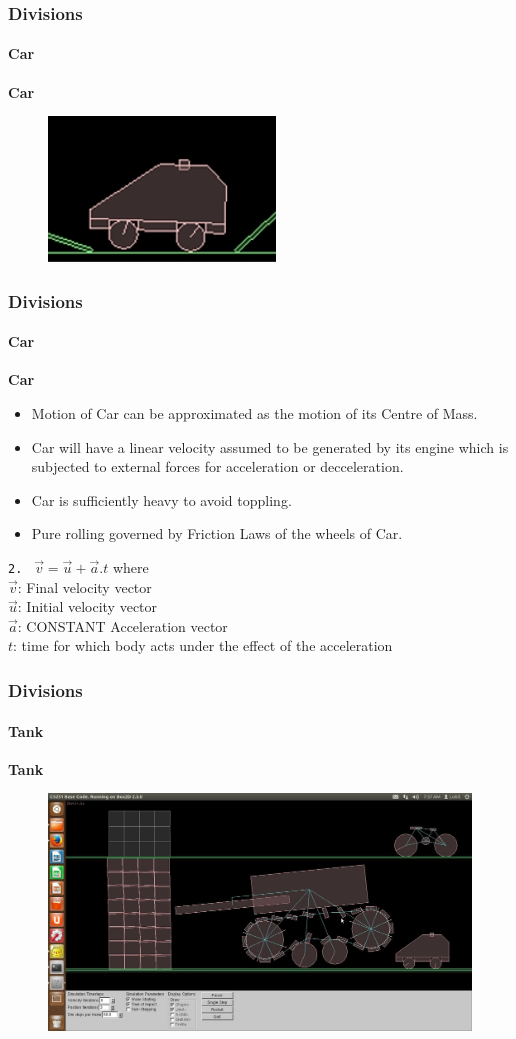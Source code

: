 \begin{frame}
\frametitle{Divisions}
\framesubtitle{Car}
  \textbf{Car}
  \begin{figure}
  \includegraphics[width=.6\textwidth,center]{./Screenshots/car.jpg}
  \end{figure}
\end{frame}

\begin{frame}
\frametitle{Divisions}
\framesubtitle{Car}
  \textbf{Car} \pause
  \begin{itemize}
    \item Motion of Car can be approximated as the motion of its Centre of Mass. \pause
    \item Car will have a linear velocity assumed to be generated by its engine which is subjected to external forces for acceleration or decceleration. \pause
    \item Car is sufficiently heavy to avoid toppling. \pause  
    \item Pure rolling governed by Friction Laws of the wheels of Car. \pause
  \end{itemize}
 \texttt{2. } $ \overrightarrow{v} = \overrightarrow{u} + \overrightarrow{a}.t $ \pause where \\
  $ \overrightarrow{v} $: Final velocity vector \\
  $ \overrightarrow{u} $: Initial velocity vector \\
  $ \overrightarrow{a} $: CONSTANT Acceleration vector \\
  $ t $: time for which body acts under the effect of the acceleration
\end{frame}

\begin{frame}
\frametitle{Divisions}
\framesubtitle{Tank}
  \textbf{Tank}
  \begin{figure}
  \includegraphics[width=.8\textwidth,center]{./Screenshots/tank.jpg}
  \end{figure}
\end{frame}
 
